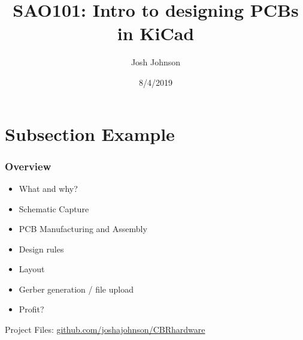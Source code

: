 \documentclass[t]{beamer}
\title[SAO101]{SAO101: Intro to designing PCBs in KiCad} %
\author{Josh Johnson} %
\institute[] %
{ \\ %
\medskip
\textit{} %
}
\date{8/4/2019} %
\begin{document}
\begin{frame}
\titlepage %
\end{frame}


\section{Subsection Example} %

\begin{frame}
\frametitle{Overview}
\begin{itemize}
\item What and why?
\item Schematic Capture
\item PCB Manufacturing and Assembly
\item Design rules
\item Layout 
\item Gerber generation / file upload
\item Profit?
\end{itemize}
\vspace{30mm}
Project Files: \url{github.com/joshajohnson/CBRhardware}\\
\end{frame}

\end{document}
